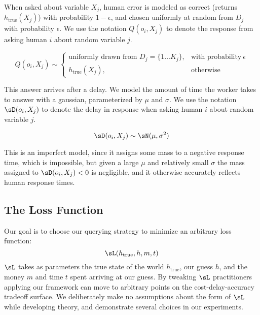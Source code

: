 When asked about variable $X_j$, human error is modeled as correct (returns $h_{\text{true}}(X_j)$) with probability $1-\epsilon$, and chosen uniformly at random from $D_j$ with probability $\epsilon$.
 We use the notation $Q(o_i, X_j)$ to denote the response from asking human $i$ about random variable $j$.

\begin{equation}
    Q(o_i, X_j) \sim
    \begin{cases}
       \text{uniformly drawn from } D_j = \{1 \ldots K_j\}, & \text{with probability}\ \epsilon \\
      h_{\text{true}}(X_j), & \text{otherwise}
    \end{cases}
 \end{equation}
 
This answer arrives after a delay.
 We model the amount of time the worker takes to answer with a gaussian, parameterized by $\mu$ and $\sigma$.
 We use the notation $\sD(o_i, X_j)$ to denote the delay in response when asking human $i$ about random variable $j$.

\[\sD(o_i, X_j) \sim \sN(\mu, \sigma^2)\]

This is an imperfect model, since it assigns some mass to a negative response time, which is impossible, but given a large $\mu$ and relatively small $\sigma$ the mass assigned to $\sD(o_i, X_j) < 0$ is negligible, and it otherwise accurately reflects human response times.

\subsection{The Loss Function}

Our goal is to choose our querying strategy to minimize an arbitrary loss function:
\[\sL(h_{\text{true}}, h, m, t)\]
$\sL$ takes as parameters the true state of the world $h_{\text{true}}$, our guess $h$, and the money $m$ and time $t$ spent arriving at our guess.
 By tweaking $\sL$ practitioners applying our framework can move to arbitrary points on the cost-delay-accuracy tradeoff surface.
 We deliberately make no assumptions about the form of $\sL$ while developing theory, and demonstrate several choices in our experiments.

